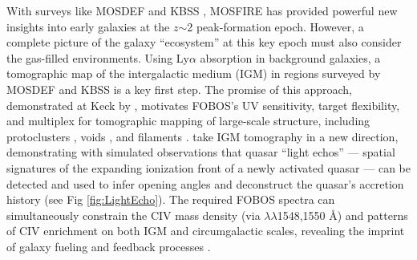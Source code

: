 With surveys like MOSDEF \citep{kriek15} and KBSS
\citep{steidel14}, MOSFIRE has provided powerful new
insights into early galaxies at the $z$$\sim$2 peak-formation epoch.
However, a complete picture of the galaxy ``ecosystem'' at this key
epoch must also consider the gas-filled environments. Using
Ly$\alpha$ absorption in background galaxies, a tomographic map of
the intergalactic medium (IGM) in regions surveyed by MOSDEF and KBSS
is a key first step. The promise of this approach, demonstrated at
Keck by \citet{lee14}, motivates FOBOS's UV sensitivity, target
flexibility, and multiplex for tomographic mapping of large-scale
structure, including protoclusters \citep{lee16}, voids
\citep{krolewski18}, and filaments \citep{horowitz19}.
\citet{2018arXiv181005156S} take IGM tomography in a new direction,
demonstrating with simulated observations that quasar ``light echos''
--- spatial signatures of the expanding ionization front of a newly
activated quasar --- can be detected and used to infer opening angles
and deconstruct the quasar's accretion history (see Fig
\ref{fig:LightEcho}). The required FOBOS spectra can simultaneously
constrain the CIV mass density (via $\lambda\lambda$1548,1550 \AA)
and patterns of CIV enrichment on both IGM and circumgalactic scales,
revealing the imprint of galaxy fueling and feedback processes
\citep[e.g.,][]{tumlinson17}.







